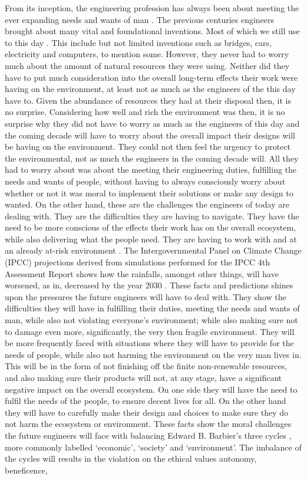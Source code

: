 \documentclass[12pt]{witseiepaper}
\begin{document}
    From its inception, the engineering profession has always been about meeting the ever expanding needs and wants of man \cite{cruickshank2003changing}. The previous centuries engineers brought about many vital and foundational inventions. Most of which we still use to this day \cite{cruickshank2003changing}. This include but not limited inventions such as bridges, cars, electricity and computers, to mention some. However, they never had to worry much about the amount of natural resources they were using. Neither did they have to put much consideration into the overall long-term effects their work were having on the environment, at least not as much as the engineers of the this day have to. Given the abundance of resources they had at their disposal then, it is no surprise. Considering how well and rich the environment was then, it is no surprise why they did not have to worry as much as the engineers of this day and the coming decade will have to worry about the overall impact their designs will be having on the environment. They could not then feel the urgency to protect the environmental, not as much the engineers in the coming decade will. All they had to worry about was about the meeting their engineering duties, fulfilling the needs and wants of people, without having to always consciously worry about whether or not it was moral to implement their solutions or make any design to wanted. On the other hand, these are the challenges the engineers of today are dealing with. They are the difficulties they are having to navigate. They have the need to be more conscious of the effects their work has on the overall ecosystem, while also delivering what the people need. They are having to work with and at an already at-risk environment \cite{macnaghten2006risk}. The Intergovernmental Panel on Climate Change (IPCC) projections derived from simulations performed for the IPCC 4th Assessment Report shows how the rainfalls, amongst other things, will have worsened, as in, decreased by the year 2030 \cite{suppiah2007australian}. These facts and predictions shines upon the pressures the future engineers will have to deal with. They show the difficulties they will have in fulfilling their duties, meeting the needs and wants of man, while also not violating everyone’s environment; while also making sure not to damage even more, significantly, the very then fragile environment. They will be more frequently faced with situations where they will have to provide for the needs of people, while also not harming the environment on the very man lives in. This will be in the form of not finishing off the finite non-renewable resources, and also making sure their products will not, at any stage, have a significant negative impact on the overall ecosystem. On one side they will have the need to fulfil the needs of the people, to ensure decent lives for all. On the other hand they will have to carefully make their design and choices to make sure they do not harm the ecosystem or environment. These facts show the moral challenges the future engineers will face with balancing Edward B. Barbier’s three cycles \cite{barbier1987concept}, more commonly labelled ‘economic’, ‘society’ and ‘environment’. The imbalance of the cycles will results in the violation on the ethical values autonomy, beneficence, 
\end{document}
